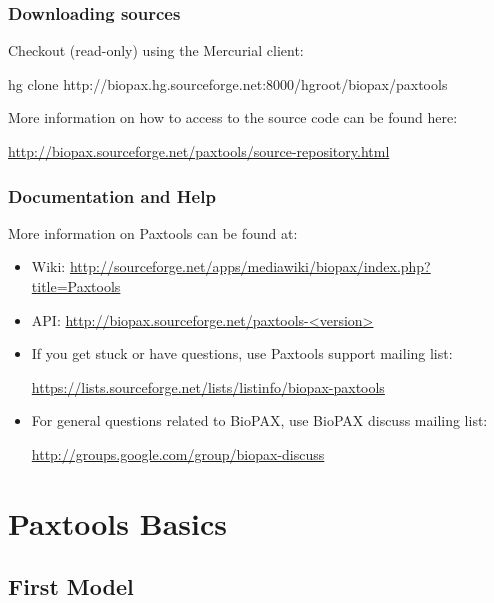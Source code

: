 \documentclass{tufte-book}
\begin{document}
\subsection{Downloading sources}

Checkout (read-only) using the Mercurial client:

\begin{fullwidth}
\begin{xmlcode}
hg clone http://biopax.hg.sourceforge.net:8000/hgroot/biopax/paxtools
\end{xmlcode}
\end{fullwidth}
More information on how to access to the source code can be found here: 	

\url{http://biopax.sourceforge.net/paxtools/source-repository.html}

\subsection{Documentation and Help}
More information on Paxtools can be found at:
\begin{fullwidth}
\begin{itemize}
\item Wiki: \url{http://sourceforge.net/apps/mediawiki/biopax/index.php?title=Paxtools} 

\item API: \url{http://biopax.sourceforge.net/paxtools-<version>}

\item If you get stuck or have questions, use Paxtools support mailing list: 	

\url{https://lists.sourceforge.net/lists/listinfo/biopax-paxtools}


\item For general questions related to BioPAX, use BioPAX discuss mailing list: 

\url{http://groups.google.com/group/biopax-discuss}

\end{itemize}
\end{fullwidth}


\chapter{Paxtools Basics}

\section{First Model}
\end{document}
